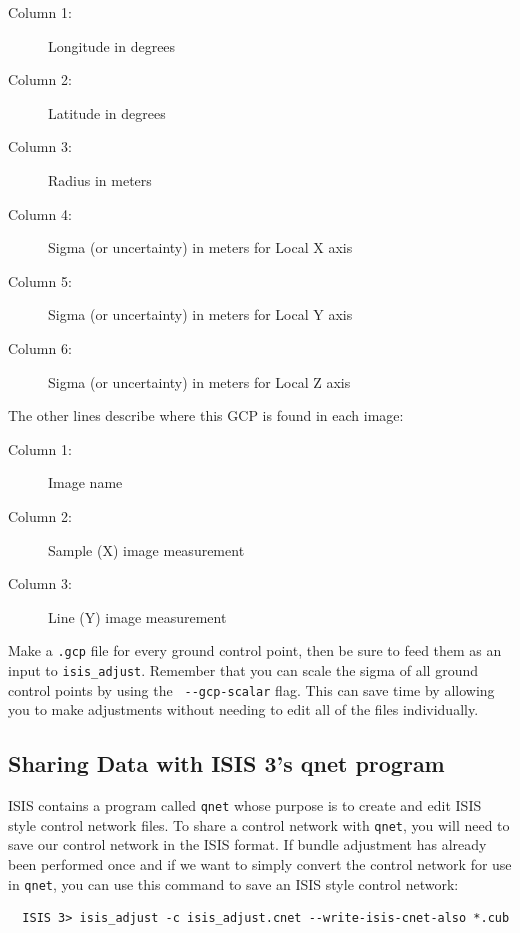 \begin{myindentpar}{2cm}
\begin{description}
  \item[Column 1:] Longitude in degrees
  \item[Column 2:] Latitude in degrees
  \item[Column 3:] Radius in meters
  \item[Column 4:] Sigma (or uncertainty) in meters for Local X axis
  \item[Column 5:] Sigma (or uncertainty) in meters for Local Y axis
  \item[Column 6:] Sigma (or uncertainty) in meters for Local Z axis
\end{description}
\end{myindentpar}

The other lines describe where this \ac{GCP} is found in each image:

\begin{myindentpar}{2cm}
\begin{description}
  \item[Column 1:] Image name
  \item[Column 2:] Sample (X) image measurement
  \item[Column 3:] Line (Y) image measurement
\end{description}
\end{myindentpar}

Make a {\tt .gcp} file for every ground control point, then be sure
to feed them as an input to {\tt isis\_adjust}. Remember that you
can scale the sigma of all ground control points by using the {\tt
-\/-gcp-scalar} flag. This can save time by allowing you to make
adjustments without needing to edit all of the files individually.

\subsection{Sharing Data with ISIS 3's qnet program}

\ac{ISIS} contains a program called \texttt{qnet} whose purpose is
to create and edit \ac{ISIS} style control network files. To share
a control network with \texttt{qnet}, you will need to save our
control network in the \ac{ISIS} format. If bundle adjustment has
already been performed once and if we want to simply convert the
control network for use in \texttt{qnet}, you can use this command
to save an \ac{ISIS} style control network:

\begin{verbatim}
  ISIS 3> isis_adjust -c isis_adjust.cnet --write-isis-cnet-also *.cub
\end{verbatim}

